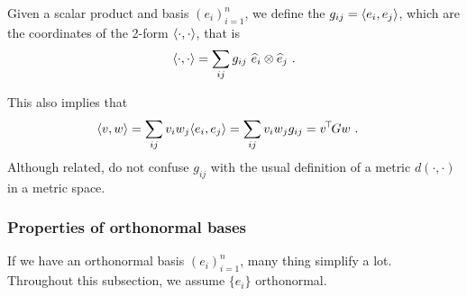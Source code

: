 \begin{myDefinition}
Given a scalar product and basis $(e_i)_{i=1}^n$, we define
the  $g_{ij} = \langle e_i,e_j\rangle$, which are the
coordinates of the 2-form $\langle\cdot,\cdot\rangle$, that is
\begin{equation}
\langle\cdot,\cdot\rangle = \sum_{ij} g_{ij}~ \widehat e_i \otimes \widehat e_j ~.
\end{equation}
\end{myDefinition}

This also implies that
\begin{align}
  \langle v,w\rangle &= \sum_{ij} v_i w_j \langle e_i, e_j\rangle = \sum_{ij} v_i w_j g_{ij}
  = v^{\!\top\!} G w ~.
\end{align}
Although related, do not confuse $g_{ij}$ with the
usual definition of a metric $d(\cdot,\cdot)$ in a metric space.

\subsubsection{Properties of orthonormal bases}

If we have an orthonormal basis $(e_i)_{i=1}^n$, many thing simplify a
lot. Throughout this subsection, we assume  $\{e_i\}$ orthonormal.

